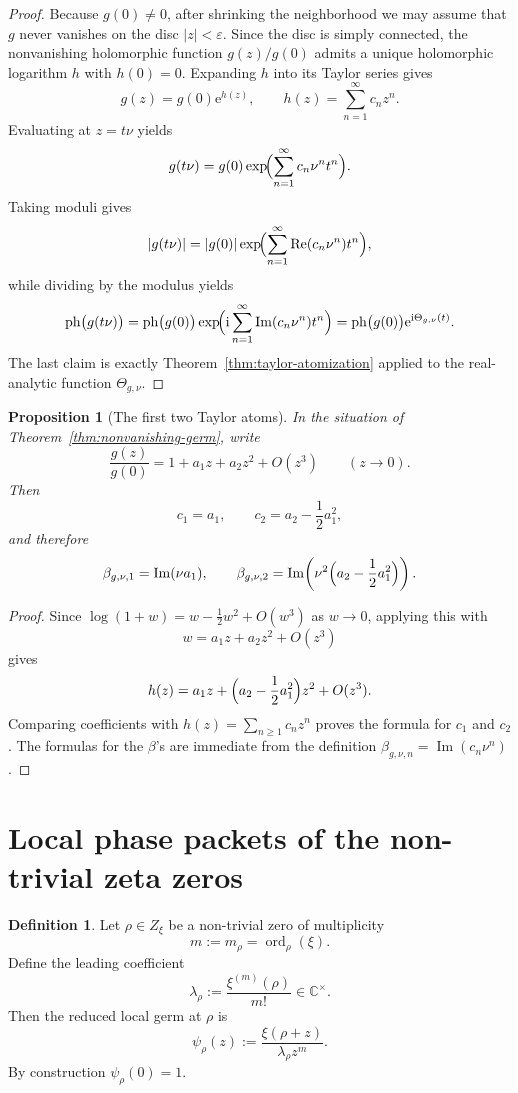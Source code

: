 \documentclass[11pt]{amsart}
\numberwithin{equation}{section}
\newtheorem{proposition}[theorem]{Proposition}
\theoremstyle{definition}
\newtheorem{definition}[theorem]{Definition}
\theoremstyle{remark}
\DeclareMathOperator{\ord}{ord}
\DeclareMathOperator{\Rea}{Re}
\DeclareMathOperator{\Ima}{Im}
\newcommand{\CC}{\mathbb C}
\newcommand{\ph}{\operatorname{ph}}
\newcommand{\e}{\mathrm e}
\newcommand{\ii}{\mathrm i}
\begin{document}
\begin{proof}
Because $g(0)\neq0$, after shrinking the neighborhood we may assume that $g$ never vanishes on the disc $|z|<\varepsilon$.  Since the disc is simply connected, the nonvanishing holomorphic function $g(z)/g(0)$ admits a unique holomorphic logarithm $h$ with $h(0)=0$.  Expanding $h$ into its Taylor series gives
\[
g(z)=g(0)\e^{h(z)},
\qquad
h(z)=\sum_{n=1}^{\infty} c_n z^n.
\]
Evaluating at $z=t\nu$ yields
\[
g(t\nu)=g(0)\exp\!\Bigl(\sum_{n=1}^{\infty} c_n\nu^n t^n\Bigr).
\]
Taking moduli gives
\[
|g(t\nu)|=|g(0)|\exp\!\Bigl(\sum_{n=1}^{\infty}\Rea(c_n\nu^n)t^n\Bigr),
\]
while dividing by the modulus yields
\[
\ph\bigl(g(t\nu)\bigr)=\ph\bigl(g(0)\bigr)\exp\!\Bigl(\ii\sum_{n=1}^{\infty}\Ima(c_n\nu^n)t^n\Bigr)
=\ph\bigl(g(0)\bigr)\e^{\ii\Theta_{g,\nu}(t)}.
\]
The last claim is exactly Theorem~\ref{thm:taylor-atomization} applied to the real-analytic function $\Theta_{g,\nu}$.
\end{proof}

\begin{proposition}[The first two Taylor atoms]\label{prop:first-two-atoms}
In the situation of Theorem~\ref{thm:nonvanishing-germ}, write
\[
\frac{g(z)}{g(0)}=1+a_1 z+a_2 z^2+O(z^3)
\qquad (z\to0).
\]
Then
\[
c_1=a_1,
\qquad
c_2=a_2-\frac12 a_1^2,
\]
and therefore
\[
\beta_{g,\nu,1}=\Ima(\nu a_1),
\qquad
\beta_{g,\nu,2}=\Ima\!\left(\nu^2\Bigl(a_2-\frac12 a_1^2\Bigr)\right).
\]
\end{proposition}

\begin{proof}
Since $\log(1+w)=w-\frac12 w^2+O(w^3)$ as $w\to0$, applying this with
\[
w=a_1 z+a_2 z^2+O(z^3)
\]
gives
\[
h(z)=a_1 z+\Bigl(a_2-\frac12 a_1^2\Bigr)z^2+O(z^3).
\]
Comparing coefficients with $h(z)=\sum_{n\ge1} c_n z^n$ proves the formula for $c_1$ and $c_2$.  The formulas for the $\beta$'s are immediate from the definition $\beta_{g,\nu,n}=\Ima(c_n\nu^n)$.
\end{proof}

\section{Local phase packets of the non-trivial zeta zeros}

\begin{definition}
Let $\rho\in Z_\xi$ be a non-trivial zero of multiplicity
\[
m:=m_\rho=\ord_\rho(\xi).
\]
Define the leading coefficient
\[
\lambda_\rho:=\frac{\xi^{(m)}(\rho)}{m!}\in\CC^\times.
\]
Then the reduced local germ at $\rho$ is
\[
\psi_\rho(z):=\frac{\xi(\rho+z)}{\lambda_\rho z^m}.
\]
By construction $\psi_\rho(0)=1$.
\end{definition}
\end{document}
